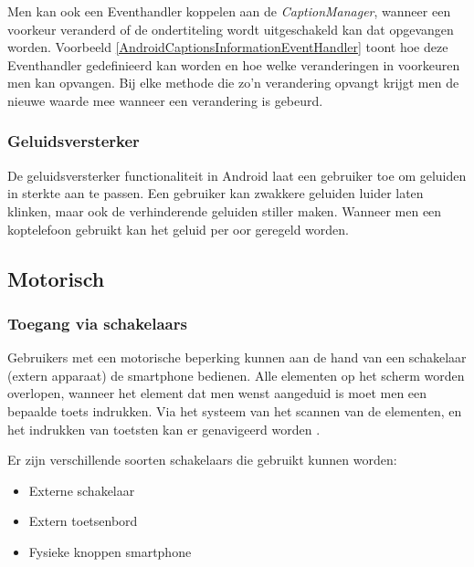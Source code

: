 

Men kan ook een Eventhandler koppelen aan de \emph{CaptionManager}, wanneer een voorkeur veranderd of de ondertiteling wordt uitgeschakeld kan dat opgevangen worden. Voorbeeld \ref{AndroidCaptionsInformationEventHandler} toont hoe deze Eventhandler gedefinieerd kan worden en hoe welke veranderingen in voorkeuren men kan opvangen. Bij elke methode die zo'n verandering opvangt krijgt men de nieuwe waarde mee wanneer een verandering is gebeurd.
\subsubsection{Geluidsversterker}
De geluidsversterker functionaliteit in Android laat een gebruiker toe om geluiden in sterkte aan te passen. Een gebruiker kan zwakkere geluiden luider laten klinken, maar ook de verhinderende geluiden stiller maken. Wanneer men een koptelefoon gebruikt kan het geluid per oor geregeld worden.
\subsection{Motorisch}
\subsubsection{Toegang via schakelaars}
Gebruikers met een motorische beperking kunnen aan de hand van een schakelaar (extern apparaat) de smartphone bedienen. Alle elementen op het scherm worden overlopen, wanneer het element dat men wenst aangeduid is moet men een bepaalde toets indrukken. Via het systeem van het scannen van de elementen, en het indrukken van toetsten kan er genavigeerd worden \autocite{switchAndroid}.

Er zijn verschillende soorten schakelaars die gebruikt kunnen worden: 
\begin{itemize}
    \item Externe schakelaar
    \item Extern toetsenbord
    \item Fysieke knoppen smartphone
\end{itemize}

    

